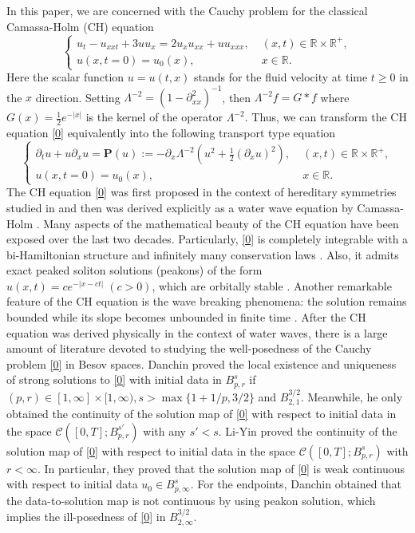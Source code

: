 \documentclass[12pt]{article}
\newcommand{\pa}{\partial}
\newcommand{\fr}{\frac}
\newcommand{\R}{\mathbb{R}}
\begin{document}
In this paper, we are concerned with the Cauchy problem for the classical Camassa-Holm (CH) equation
\begin{equation}\label{0}
\begin{cases}
u_t-u_{xxt}+3uu_x=2u_xu_{xx}+uu_{xxx}, \; &(x,t)\in \R\times\R^+,\\
u(x,t=0)=u_0(x),\; &x\in \R.
\end{cases}
\end{equation}
Here the scalar function $u = u(t, x)$ stands for the fluid velocity at time $t\geq0$ in the $x$ direction.
Setting $\Lambda^{-2}=(1-\pa^2_{xx})^{-1}$, then $\Lambda^{-2}f=G*f$ where $G(x)=\fr12e^{-|x|}$ is the kernel of the operator $\Lambda^{-2}$. Thus, we can transform the CH equation \eqref{0} equivalently into the following transport type equation
\begin{equation}\label{CH}
\begin{cases}
\partial_tu+u\pa_xu=\mathbf{P}(u):=-\pa_x\Lambda^{-2}\left(u^2+\fr12(\pa_xu)^2\right), \; &(x,t)\in \R\times\R^+,\\
u(x,t=0)=u_0(x),\; &x\in \R.
\end{cases}
\end{equation}
The CH equation \eqref{0} was first proposed in the context of hereditary symmetries studied in \cite{Fokas} and then was derived explicitly as a water wave equation by Camassa-Holm \cite{Camassa}. Many aspects of the mathematical beauty of the CH equation have been exposed over the last two decades. Particularly,  \eqref{0} is completely integrable \cite{Camassa,Constantin-P} with a bi-Hamiltonian structure \cite{Constantin-E,Fokas} and infinitely many conservation laws \cite{Camassa,Fokas}. Also, it admits exact peaked soliton solutions (peakons) of the form $u(x,t)=ce^{-|x-ct|}\;(c>0)$, which are orbitally stable \cite{Constantin.Strauss}. Another remarkable feature of the CH equation is the wave breaking phenomena: the solution remains bounded while its slope becomes unbounded in finite time \cite{Constantin}.
After the CH equation was derived physically in the context of water waves, there is a large amount of literature devoted to studying the well-posedness of the Cauchy problem \eqref{0} in Besov spaces. Danchin \cite{d1,d3} proved the local existence and uniqueness of strong solutions to \eqref{0} with initial data in $B^s_{p,r}$ if $(p,r)\in[1,\infty]\times[1,\infty), s>\max\big\{1+1/p, 3/2\big\}$ and $B^{3/2}_{2,1}$.  Meanwhile, he \cite{d1} only obtained the continuity of the solution map of \eqref{0} with respect to initial data in the space $\mathcal{C}([0, T ];B^{s'}_{p,r})$ with any $s'<s$. Li-Yin \cite{Li-Yin1} proved the continuity of the solution map of \eqref{0} with respect to initial data in the space $\mathcal{C}([0, T];B^{s}_{p,r})$ with $r<\infty$. In particular, they \cite{Li-Yin1} proved that the solution map of \eqref{0} is weak continuous with respect to initial data $u_0\in B^s_{p,\infty}$. For the endpoints, Danchin \cite{d3} obtained that the data-to-solution map is not continuous by using peakon solution, which implies the ill-posedness of \eqref{0} in $B^{3/2}_{2,\infty}$.
\end{document}
